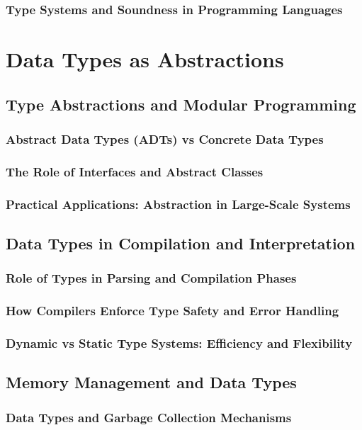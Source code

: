 \documentclass[12pt, oneside]{book}
\begin{document}
\subsubsection{Type Systems and Soundness in Programming Languages}

\section{Data Types as Abstractions}
\subsection{Type Abstractions and Modular Programming}
\subsubsection{Abstract Data Types (ADTs) vs Concrete Data Types}
\subsubsection{The Role of Interfaces and Abstract Classes}
\subsubsection{Practical Applications: Abstraction in Large-Scale Systems}
\subsection{Data Types in Compilation and Interpretation}
\subsubsection{Role of Types in Parsing and Compilation Phases}
\subsubsection{How Compilers Enforce Type Safety and Error Handling}
\subsubsection{Dynamic vs Static Type Systems: Efficiency and Flexibility}
\subsection{Memory Management and Data Types}
\subsubsection{Data Types and Garbage Collection Mechanisms}
\end{document}
